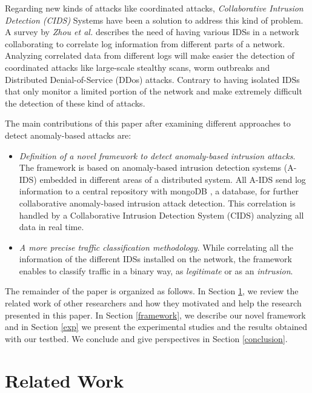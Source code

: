 \documentclass[conference]{IEEEtran}
\begin{document}
Regarding new kinds of attacks like coordinated attacks, \textit{{Collaborative Intrusion Detection (CIDS)}} Systems have been a solution to address this kind of problem. A survey by \textit{Zhou et al.} \cite{zhou2010survey} describes the need of having various IDSs in a network collaborating to correlate log information from different parts of a network. Analyzing correlated data from different logs will make easier the detection of coordinated attacks like large-scale stealthy scans, worm outbreaks and Distributed Denial-of-Service (DDos) attacks. Contrary to having isolated IDSs that only monitor a limited portion of the network and make extremely difficult the detection of these kind of attacks.  

The main contributions of this paper after examining different approaches to detect anomaly-based attacks are:
\begin{itemize}
\item \textit{Definition of a novel framework to detect anomaly-based intrusion attacks}.  The framework is based on anomaly-based intrusion detection systems (A-IDS) embedded in different areas of a distributed system. All A-IDS send log information to a central repository with mongoDB \cite{mongoDB}, a database, for further collaborative anomaly-based intrusion attack detection. This correlation is handled by a Collaborative Intrusion Detection System (CIDS) analyzing all data in real time. 
\item \textit{A more precise traffic classification methodology}. While correlating all the information of the different IDSs installed on the network, the framework enables to classify traffic in a binary way, as \textit{legitimate} or as an  \textit{intrusion}.
\end{itemize}

The remainder of the paper is organized as follows.  In Section \ref{rw}, we review the related work of other researchers and how they motivated and help the research presented in this paper.  In Section \ref{framework}, we describe our novel framework and in Section \ref{exp} we present the experimental studies and the results obtained with our testbed. We conclude and give perspectives in Section \ref{conclusion}.

\section{Related Work}
\label{rw}

\end{document}
